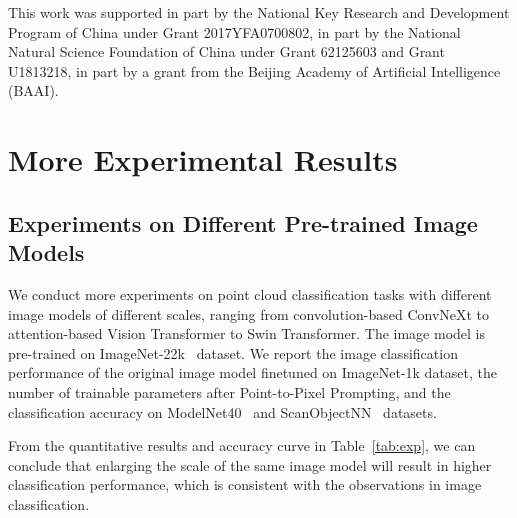 \documentclass{article}
\begin{document}
\begin{ack}
This work was supported in part by the National Key Research and Development Program of China
under Grant 2017YFA0700802, in part by the National Natural Science Foundation of China under
Grant 62125603 and Grant U1813218, in part by a grant from the Beijing Academy of Artificial
Intelligence (BAAI).
\end{ack}

\appendix

\section{More Experimental Results}

\subsection{Experiments on Different Pre-trained Image Models}

We conduct more experiments on point cloud classification tasks with different image models of different scales, ranging from convolution-based ConvNeXt to attention-based Vision Transformer to Swin Transformer. The image model is pre-trained on ImageNet-22k~\cite{deng2009imagenet} dataset. We report the image classification performance of the original image model finetuned on ImageNet-1k dataset, the number of trainable parameters after Point-to-Pixel Prompting, and the classification accuracy on ModelNet40~\cite{wu2015modelnet} and ScanObjectNN~\cite{uy2019scanobjectnn} datasets.

From the quantitative results and accuracy curve in Table~\ref{tab:exp}, we can conclude that enlarging the scale of the same image model will result in higher classification performance, which is consistent with the observations in image classification. 
\end{document}
